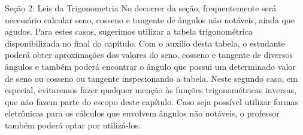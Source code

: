 \begin{paginatexto}{Seção 2: Leis da Trigonometria}
No decorrer da seção, frequentemente será necessário calcular seno, cosseno e tangente de ângulos não notáveis, ainda que agudos. 
%
Para estes casos, sugerimos utilizar a tabela trigonométrica disponibilizada no final do capítulo. %
Com o auxílio desta tabela, o estudante poderá obter aproximações dos valores do seno, cosseno e tangente de diversos ângulos e também poderá encontrar o ângulo que possui um determinado valor de seno ou cosseno ou tangente inspecionando a tabela. Neste segundo caso, em especial, evitaremos fazer qualquer menção às funções trigonométricas inversas, que não fazem parte do escopo deste capítulo.
%
Caso seja possível utilizar formas eletrônicas para os cálculos que envolvem ângulos não notáveis, o professor também poderá optar por utilizá-los.
\end{paginatexto}

